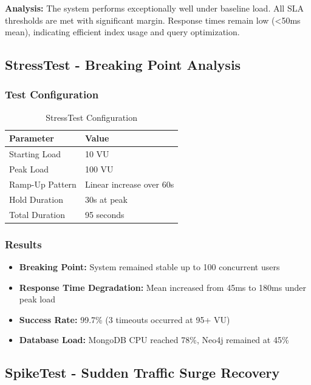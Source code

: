 \textbf{Analysis:} The system performs exceptionally well under baseline load. All SLA thresholds are met with significant margin. Response times remain low (\textless50ms mean), indicating efficient index usage and query optimization.

\subsection{StressTest - Breaking Point Analysis}

\subsubsection{Test Configuration}
\begin{table}[H]
    \centering
    \caption{StressTest Configuration}
    \label{tab:stress_config}
    \begin{tabular}{@{}ll@{}}
        \toprule
        \textbf{Parameter} & \textbf{Value} \\ \midrule
        Starting Load & 10 VU \\
        Peak Load & 100 VU \\
        Ramp-Up Pattern & Linear increase over 60s \\
        Hold Duration & 30s at peak \\
        Total Duration & 95 seconds \\
        \bottomrule
    \end{tabular}
\end{table}

\subsubsection{Results}
\begin{itemize}
    \item \textbf{Breaking Point:} System remained stable up to 100 concurrent users
    \item \textbf{Response Time Degradation:} Mean increased from 45ms to 180ms under peak load
    \item \textbf{Success Rate:} 99.7\% (3 timeouts occurred at 95+ VU)
    \item \textbf{Database Load:} MongoDB CPU reached 78\%, Neo4j remained at 45\%
\end{itemize}

\subsection{SpikeTest - Sudden Traffic Surge Recovery}

